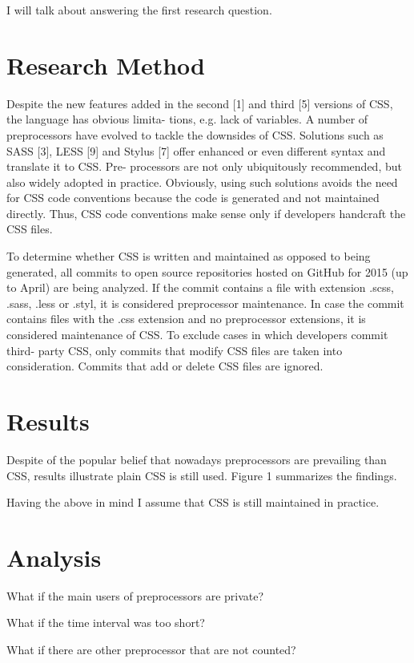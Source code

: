 \documentclass[parskip=full]{uvamscse}
\begin{document}
I will talk about answering the first research question.

\section{Research Method}

Despite the new features added in the second [1] and third [5] versions of CSS, the language has
obvious limita- tions, e.g. lack of variables. A number of preprocessors have evolved to tackle the
downsides of CSS. Solutions such as SASS [3], LESS [9] and Stylus [7] offer enhanced or even
different syntax and translate it to CSS. Pre- processors are not only ubiquitously recommended, but
also widely adopted in practice. Obviously, using such solutions avoids the need for CSS code
conventions because the code is generated and not maintained directly. Thus, CSS code conventions
make sense only if developers handcraft the CSS files.

To determine whether CSS is written and maintained as opposed to being generated, all commits to
open source repositories hosted on GitHub for 2015 (up to April) are being analyzed. If the commit
contains a file with extension .scss, .sass, .less or .styl, it is considered preprocessor
maintenance. In case the commit contains files with the .css extension and no preprocessor
extensions, it is considered maintenance of CSS. To exclude cases in which developers commit third-
party CSS, only commits that modify CSS files are taken into consideration. Commits that add or
delete CSS files are ignored.

\section{Results}

Despite of the popular belief that nowadays preprocessors are prevailing than CSS, results
illustrate plain CSS is still used. Figure 1 summarizes the findings.

Having the above in mind I assume that CSS is still maintained in practice.

\section{Analysis}

What if the main users of preprocessors are private?

What if the time interval was too short?

What if there are other preprocessor that are not counted?
\end{document}
